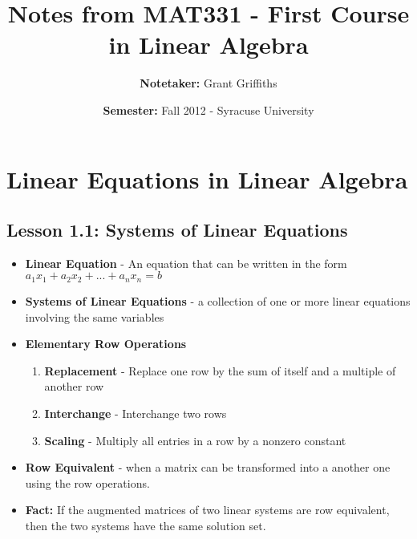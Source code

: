 \documentclass{report}
\title{\textbf{Notes from MAT331 - First Course in Linear Algebra}}
\author{\textbf{Notetaker: }Grant Griffiths}
\date{\textbf{Semester: }Fall 2012 - Syracuse University}
\begin{document}
   \maketitle
   \tableofcontents

\chapter{Linear Equations in Linear Algebra}
\section{Lesson 1.1: Systems of Linear Equations}
	\begin{itemize}\addtolength{\leftskip}{2em}
	\item \textbf{Linear Equation} - An equation that can be written in the form $ a_{1}x_{1}  + a_{2}x_{2} + ... + a_{n}x_{n} = b$
	\item \textbf{Systems of Linear Equations} - a collection of one or more linear equations involving the same variables
	\item \textbf{Elementary Row Operations}
		\begin{enumerate}
		\setlength{\itemindent}{4em}
			\item \textbf{Replacement} - Replace one row by the sum of itself and a multiple of another row
			\item \textbf{Interchange} - Interchange two rows
			\item \textbf{Scaling} - Multiply all entries in a row by a nonzero constant
		\end{enumerate}
	\item \textbf{Row Equivalent} - when a matrix can be transformed into a another one using the row operations.
	\item \textbf{Fact: }If the augmented matrices of two linear systems are row equivalent, then the two systems have the same solution set.
	\end{itemize}
\end{document}
